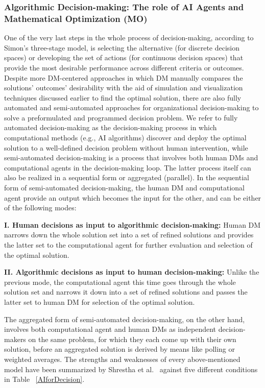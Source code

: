 \documentclass{sfuthesis}
\begin{document}
\subsubsection{Algorithmic Decision-making: The role of AI Agents and Mathematical Optimization (MO)}
One of the very last steps in the whole process of decision-making, according to Simon’s three-stage model, is selecting the alternative (for discrete decision spaces) or developing the set of actions (for continuous decision spaces) that provide the most desirable performance across different criteria or outcomes. Despite more DM-centered approaches in which DM manually compares the solutions’ outcomes’ desirability with the aid of simulation and visualization techniques discussed earlier to find the optimal solution, there are also fully automated and semi-automated approaches for organizational decision-making to solve a preformulated and programmed decision problem. We refer to fully automated decision-making as the decision-making process in which computational methods (e.g., AI algorithms) discover and deploy the optimal solution to a well-defined decision problem without human intervention, while semi-automated decision-making is a process that involves both human DMs and computational agents in the decision-making loop. The latter process itself can also be realized in a sequential form or aggregated (parallel). In the sequential form of semi-automated decision-making, the human DM and computational agent provide an output which becomes the input for the other, and can be either of the following modes:\par
\textbf{I. Human decisions as input to algorithmic decision-making:} Human DM narrows down the whole solution set into a set of refined solutions and provides the latter set to the computational agent for further evaluation and selection of the optimal solution.\par
\textbf{II.	Algorithmic decisions as input to human decision-making:} Unlike the previous mode, the computational agent this time goes through the whole solution set and narrows it down into a set of refined solutions and passes the latter set to human DM for selection of the optimal solution.\par
The aggregated form of semi-automated decision-making, on the other hand, involves both computational agent and human DMs as independent decision-makers on the same problem, for which they each come up with their own solution, before an aggregated solution is derived by means like polling or weighted averages. The strengths and weaknesses of every above-mentioned model have been summarized by Shrestha et al.~\cite{shrestha_organizational_2019} against five different conditions in Table ~\ref{AIforDecision}.\par
\end{document}
